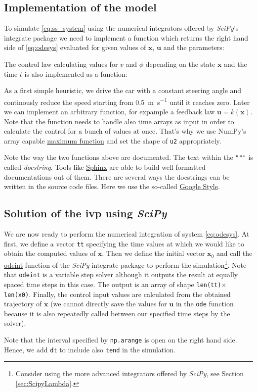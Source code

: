 \documentclass[a4paper,11pt,headings=standardclasses,parskip=half]{scrartcl}
\newcommand{\listcode}[3]{}
\newcommand{\listcodeplot}[2]{\listcode{#1}{#2}{../sim/01_car_example_plotting.py}}
\newcommand{\scipy}{\emph{SciPy}\xspace}
\newcommand{\uu}{\mathbf{u}}
\newcommand{\x}{\mathbf{x}}
\newcommand{\xZero}{\mathbf{x}_0}
\begin{document}
\subsection{Implementation of the model} \label{sec:implementation-model}
To simulate \eqref{eq:ss_system} using the numerical integrators offered by \scipy's integrate package we need to implement a function which returns the right hand side of \eqref{eq:odesys} evaluated for given values of $\x$, $\uu$ and the parameters:
\listcodeplot{24}{44}
The control law calculating values for $v$ and $\phi$ depending on the state $\x$ and the time $t$ is also implemented as a function:
\listcodeplot{47}{60}
As a first simple heuristic, we drive the car with a constant steering angle and continously reduce the speed starting from \SI{0.5}{\meter\per\second} until it reaches zero. Later we can implement an arbitrary function, for expample a feedback law $\uu=k(\x)$. Note that the function needs to handle also time arrays as input in order to calculate the control for a bunch of values at once. That's why we use NumPy's array capable \href{https://docs.scipy.org/doc/numpy/reference/generated/numpy.maximum.html}{maximum function} and set the shape of \texttt{u2} appropriately.

Note the way the two functions above are documented. The text within the \texttt{"""} is called \emph{docstring}. Tools like \href{http://www.sphinx-doc.org/en/stable/}{Sphinx} are able to build well formatted documentations out of them. There are several ways the docstrings can be written in the source code files. Here we use the so-called \href{https://sphinxcontrib-napoleon.readthedocs.io/en/latest/example_google.html}{Google Style}.

\subsection{Solution of the \gls{ivp} using \scipy}
We are now ready to perform the numerical integration of system \eqref{eq:odesys}. At first, we define a vector \texttt{tt} specifying the time values at which we would like to obtain the computed values of $\x$. Then we define the initial vector $\xZero$ and call the  \href{https://docs.scipy.org/doc/scipy/reference/generated/scipy.integrate.odeint.html}{odeint} function of the \scipy integrate package to perform the simulation\footnote{Consider using the more advanced integrators offered by \scipy, see Section \ref{sec:ScipyLambda}.}. Note that \texttt{odeint} is a variable step solver although it outputs the result at equally spaced time steps in this case. The output is an array of shape \texttt{len(tt)}$\times$\texttt{len(x0)}. Finally, the control input values are calculated from the obtained trajectory of $\x$ (we cannot directly save the values for $\uu$ in the \texttt{ode} function because it is also repeatedly called between our specified time steps by the solver).
\listcodeplot{135}{143}
Note that the interval specified by \texttt{np.arange} is open on the right hand side. Hence, we add \texttt{dt} to include also \texttt{tend} in the simulation. 
\end{document}
